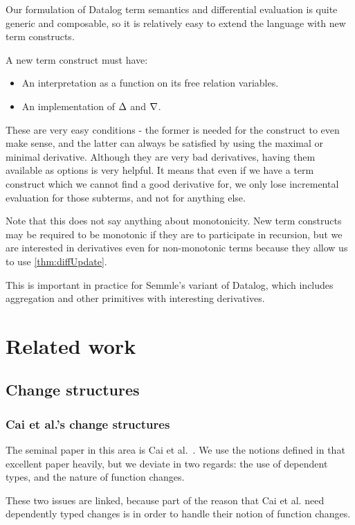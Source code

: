 Our formulation of Datalog term semantics and differential evaluation is quite
generic and composable, so it is relatively easy to extend the language with new
term constructs.

A new term construct must have:
\begin{itemize}
  \item An interpretation as a function on its free relation variables.
  \item An implementation of $\Delta$ and $\nabla$.
\end{itemize}

These are very easy conditions - the former is needed for the construct to even
make sense, and the latter can always be satisfied by using the maximal or
minimal derivative. Although they are very bad derivatives, having them
available as options is very helpful. It means that even if we have a term
construct which we cannot find a good derivative for, we only lose incremental
evaluation for those subterms, and not for anything else.

Note that this does not say anything about monotonicity. New term constructs may
be required to be monotonic if they are to participate in recursion, but we are
interested in derivatives even for non-monotonic terms because they allow us to
use \ref{thm:diffUpdate}.

This is important in practice for Semmle's variant of Datalog, which includes
aggregation and other primitives with interesting derivatives.

\section{Related work}

\subsection{Change structures}

\subsubsection{Cai et al.'s change structures}

The seminal paper in this area is Cai et al.~\cite{cai2014changes}. We use the notions
defined in that excellent paper heavily, but we deviate in two regards: the use of
dependent types, and the nature of function changes.

These two issues are linked, because part of the reason that Cai et al. need
dependently typed changes is in order to handle their notion of function
changes.

